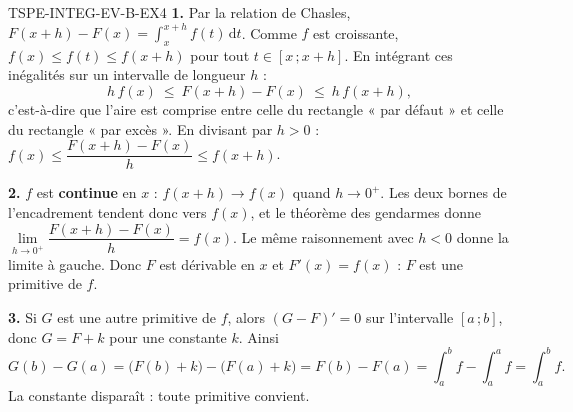 \begin{corrige}{TSPE-INTEG-EV-B-EX4}
\textbf{1.} Par la relation de Chasles, $F(x+h)-F(x)=\displaystyle\int_x^{x+h}f(t)\,\mathrm{d}t$. Comme $f$ est croissante, $f(x)\leq f(t)\leq f(x+h)$ pour tout $t\in[x\,;x+h]$. En intégrant ces inégalités sur un intervalle de longueur $h$ :
\[
  h\,f(x)\ \leq\ F(x+h)-F(x)\ \leq\ h\,f(x+h),
\]
c'est-à-dire que l'aire est comprise entre celle du rectangle « par défaut » et celle du rectangle « par excès ». En divisant par $h>0$ :
$f(x)\leq\dfrac{F(x+h)-F(x)}{h}\leq f(x+h)$.

\textbf{2.} $f$ est \textbf{continue} en $x$ : $f(x+h)\to f(x)$ quand $h\to0^+$. Les deux bornes de l'encadrement tendent donc vers $f(x)$, et le théorème des gendarmes donne
$\lim\limits_{h\to0^+}\dfrac{F(x+h)-F(x)}{h}=f(x)$. Le même raisonnement avec $h<0$ donne la limite à gauche. Donc $F$ est dérivable en $x$ et $F'(x)=f(x)$ : $F$ est une primitive de $f$.

\textbf{3.} Si $G$ est une autre primitive de $f$, alors $(G-F)'=0$ sur l'intervalle $[a\,;b]$, donc $G=F+k$ pour une constante $k$. Ainsi
\[
  G(b)-G(a)=\big(F(b)+k\big)-\big(F(a)+k\big)=F(b)-F(a)=\int_a^b f-\int_a^a f=\int_a^b f .
\]
La constante disparaît : toute primitive convient.
\end{corrige}

